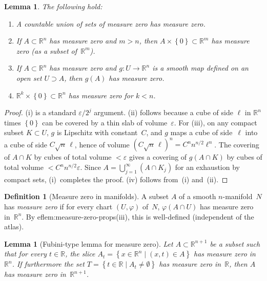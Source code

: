 \documentclass[12pt,a4paper,openany]{book}
\newtheorem{lemma}[theorem]{Lemma}
\theoremstyle{definition}
\newtheorem{definition}[theorem]{Definition}
\theoremstyle{remark}
\newcommand{\R}{\mathbb{R}}
\newcommand{\set}[1]{\left\{ #1 \right\}}
\begin{document}
\begin{lemma}\label{lem:measure-zero-props}
The following hold:
\begin{enumerate}[label=(\roman*)]
  \item A countable union of sets of measure zero has measure zero.
  \item If $A\subset\R^n$ has measure zero and $m > n$, then
    $A\times\set{0}\subset\R^m$ has measure zero (as a subset of~$\R^m$).
  \item If $A\subset\R^n$ has measure zero and $g\colon U\to\R^n$
    is a smooth map defined on an open set $U\supset A$, then
    $g(A)$ has measure zero.
  \item $\R^k\times\set{0}\subset\R^n$ has measure zero for $k < n$.
\end{enumerate}
\end{lemma}

\begin{proof}
(i) is a standard $\varepsilon/2^j$ argument.  (ii) follows because
a cube of side $\ell$ in $\R^n$ times $\set{0}$ can be covered by
a thin slab of volume~$\varepsilon$.  For (iii), on any compact subset
$K\subset U$, $g$ is Lipschitz with constant~$C$, and $g$ maps a cube
of side~$\ell$ into a cube of side $C\sqrt{n}\,\ell$, hence of volume
$(C\sqrt{n}\,\ell)^n = C^n n^{n/2}\ell^n$.  The covering of $A\cap K$
by cubes of total volume $<\varepsilon$ gives a covering of
$g(A\cap K)$ by cubes of total volume $<C^n n^{n/2}\varepsilon$.
Since $A = \bigcup_{j=1}^\infty (A\cap K_j)$ for an exhaustion by
compact sets, (i)~completes the proof.
(iv) follows from~(i) and~(ii).
\end{proof}

\begin{definition}[Measure zero in manifolds]\label{def:measure-zero-manifold}
A subset $A$ of a smooth $n$-manifold~$N$ has \emph{measure zero} if
for every chart $(U,\varphi)$ of~$N$, $\varphi(A\cap U)$ has measure
zero in~$\R^n$.  By 
ef{lem:measure-zero-props}(iii), this is
well-defined (independent of the atlas).
\end{definition}

\begin{lemma}[Fubini-type lemma for measure zero]\label{lem:fubini-measure-zero}
Let $A\subset\R^{n+1}$ be a subset such that for every $t\in\R$, the
slice $A_t = \set{x\in\R^n \mid (x,t)\in A}$ has measure zero in~$\R^n$.
If furthermore the set $T = \set{t\in\R \mid A_t\ne\emptyset}$ has measure
zero in~$\R$, then $A$ has measure zero in~$\R^{n+1}$.
\end{lemma}
\end{document}
